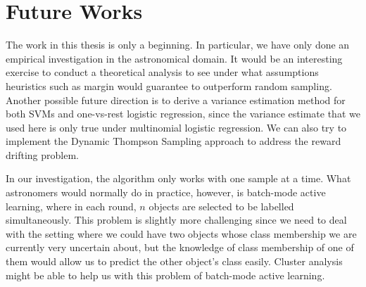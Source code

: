 \section{Future Works}
\label{sec:future}

The work in this thesis is only a beginning. In particular, we have only done an empirical
investigation in the astronomical domain. It would be an interesting exercise to conduct a
theoretical analysis to see under what assumptions heuristics such as margin would guarantee to
outperform random sampling. Another possible future direction is to derive a variance estimation
method for both SVMs and one-vs-rest logistic regression, since the variance estimate that we used here
is only true under multinomial logistic regression. We can also try to implement the Dynamic
Thompson Sampling approach to address the reward drifting problem.

In our investigation, the algorithm only works with one sample at a time. What astronomers would
normally do in practice, however, is batch-mode active learning, where in each round, $n$ objects are
selected to be labelled simultaneously. This problem is slightly more challenging since we need to
deal with the setting where we could have two objects whose class membership we are currently very
uncertain about, but the knowledge of class membership of one of them would allow us to predict the
other object's class easily. Cluster analysis might be able to help us with this problem of batch-mode
active learning.

